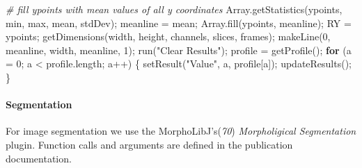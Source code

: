 \documentclass[10pt, b5paper, singlespacinge, twoside]{reedthesis} %
\newenvironment{Shaded}{}{}
\newcommand{\AttributeTok}[1]{#1}
\newcommand{\CommentTok}[1]{\textit{#1}}
\newcommand{\ControlFlowTok}[1]{\textbf{#1}}
\newcommand{\DecValTok}[1]{#1}
\newcommand{\FunctionTok}[1]{#1}
\newcommand{\NormalTok}[1]{#1}
\newcommand{\OtherTok}[1]{#1}
\newcommand{\SpecialCharTok}[1]{#1}
\newcommand{\StringTok}[1]{#1}
\theoremstyle{definition}
\theoremstyle{definition}
\theoremstyle{definition}
\theoremstyle{remark}
\begin{document}
\begin{Shaded}
\begin{Highlighting}[numbers=left,,]
\CommentTok{\# fill ypoints with mean values of all y coordinates}
    \FunctionTok{Array.getStatistics}\NormalTok{(ypoints, min, max, mean, stdDev);}
\NormalTok{    meanline }\OtherTok{=}\NormalTok{ mean;}
    \FunctionTok{Array.fill}\NormalTok{(ypoints, meanline);}
\NormalTok{    RY }\OtherTok{=}\NormalTok{ ypoints;}
    \FunctionTok{getDimensions}\NormalTok{(width, height, channels, slices, frames);}
    \FunctionTok{makeLine}\NormalTok{(}\DecValTok{0}\NormalTok{, meanline, width, meanline, }\DecValTok{1}\NormalTok{);}
    \FunctionTok{run}\NormalTok{(}\StringTok{"Clear Results"}\NormalTok{);}
\NormalTok{    profile }\OtherTok{=} \FunctionTok{getProfile}\NormalTok{();}
    \ControlFlowTok{for}\NormalTok{ (}\AttributeTok{a =} \DecValTok{0}\NormalTok{; a }\SpecialCharTok{\textless{}}\NormalTok{ profile.length; a}\SpecialCharTok{++}\NormalTok{) \{}
    \FunctionTok{setResult}\NormalTok{(}\StringTok{"Value"}\NormalTok{, a, profile[a]);}
        \FunctionTok{updateResults}\NormalTok{();}
\NormalTok{    \}}
\end{Highlighting}
\end{Shaded}
\normalsize

\hypertarget{segmentation-2}{%
\paragraph{Segmentation}\label{segmentation-2}}

For image segmentation we use the MorphoLibJ's(\emph{70}) \emph{Morpholigical Segmentation} plugin. Function calls and arguments are defined in the publication documentation.
\end{document}
